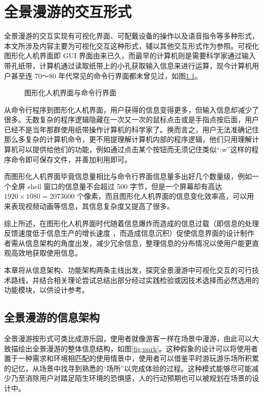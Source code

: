 \chapter{全景漫游的交互形式}

全景漫游的交互实现有可视化界面、可配戴设备的操作以及语音指令等多种形式，本文所涉及内容主要为可视化交互这种形式，辅以其他交互形式作为参照。可视化图形化人机界面即 GUI 界面由来已久，而最早的计算机则是需要科学家通过输入带孔纸带，计算机通过读取纸带上的小孔获取输入信息来进行运算，现今计算机用户甚至连 70～80 年代常见的命令行界面都未曾见过，如图\ref{fig:gui&cli}。

\begin{figure}[htp]
\centering
{}
\caption{图形化人机界面与命令行界面}
\label{fig:gui&cli}
\end{figure}

从命令行程序到图形化人机界面，用户获得的信息变得更多，但输入信息却减少了很多。无数复杂的程序逻辑隐藏在一次又一次的鼠标点击或是手指点按后面，用户已经不是当年那群使用纸带操作计算机的科学家了。换而言之，用户无法准确记住那么多复杂的计算机命令，更不用提理解计算机内部的程序逻辑，他们只用理解计算机可以提供给他们的功能，例如通过点击某个按钮而无须记住类似“:w”这样的程序命令即可保存文件，并善加利用即可。

而图形化人机界面毕竟信息量相比与命令行界面信息量多出好几个数量级，例如一个全屏 shell 窗口的信息量不会超过 500 字节，但是一个屏幕却有高达 $1920\times1080=2073600$ 个像素，而且图形化人机界面的信息变化效率高，可以用来表现视频动画等信息，其信息复杂度又提高了很多。

综上所述，在图形化人机界面时代随着信息爆炸而造成的信息过载（即信息的处理反馈速度低于信息生产的增长速度
，而造成信息沉积）促使信息界面的设计制作者需从信息架构的角度出发，减少冗余信息，整理信息的分布情况以使用户能更直观高效地获取使用信息。

本章将从信息架构、功能架构两条主线出发，探究全景漫游中可视化交互的可行技术路线，并结合相关理论尝试总结出部分经过实践检验或因技术选择而必然选用的功能模块，以供设计参考。


\section{全景漫游的信息架构}

全景漫游按形式可类比成游乐园，使用者就像游客一样在场景中漫游，由此可以大致描绘出全景漫游的整体信息结构，如图\ref{fig:park}。这种假象的设计可以将使用者置于一种需求和环境相匹配的使用情景中，使用者可以借鉴平时游玩游乐场所积累的记忆，从场景中找寻到熟悉的“场所”以完成体验的过程。这种模式能够尽可能减少乃至消除用户对踏足陌生环境的恐惧感，人的行动预期也可以被规划在场景的设计中。

